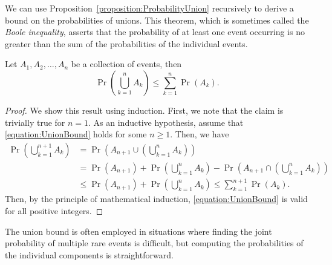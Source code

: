 We can use Proposition~\ref{proposition:ProbabilityUnion} recursively to derive a bound on the probabilities of unions.
This theorem, which is sometimes called the \emph{Boole inequality}, asserts that the probability of at least one event occurring is no greater than the sum of the probabilities of the individual events.

\begin{theorem}
Let $A_1, A_2, \ldots, A_n$ be a collection of events, then
\begin{equation} \label{equation:UnionBound}
\Pr \left( \bigcup_{k=1}^n A_k \right)
\leq \sum_{k=1}^n \Pr (A_k) .
\end{equation}
\end{theorem}
\begin{proof}
We show this result using induction.
First, we note that the claim is trivially true for $n = 1$.
As an inductive hypothesis, assume that \eqref{equation:UnionBound} holds for some $n \geq 1$.
Then, we have
\begin{equation*}
\begin{split}
\Pr \left( \bigcup_{k=1}^{n+1} A_k \right)
&= \Pr \left( A_{n+1} \cup \left( \bigcup_{k=1}^{n} A_k \right) \right) \\
&= \Pr (A_{n+1}) + \Pr \left( \bigcup_{k=1}^{n} A_k \right)
- \Pr \left( A_{n+1} \cap \left( \bigcup_{k=1}^{n} A_k \right) \right) \\
&\leq \Pr (A_{n+1}) + \Pr \left( \bigcup_{k=1}^{n} A_k \right)
\leq \sum_{k = 1}^{n+1} \Pr (A_k) .
\end{split}
\end{equation*}
Then, by the principle of mathematical induction, \eqref{equation:UnionBound} is valid for all positive integers.
\end{proof}

The union bound is often employed in situations where finding the joint probability of multiple rare events is difficult, but computing the probabilities of the individual components is straightforward. 

